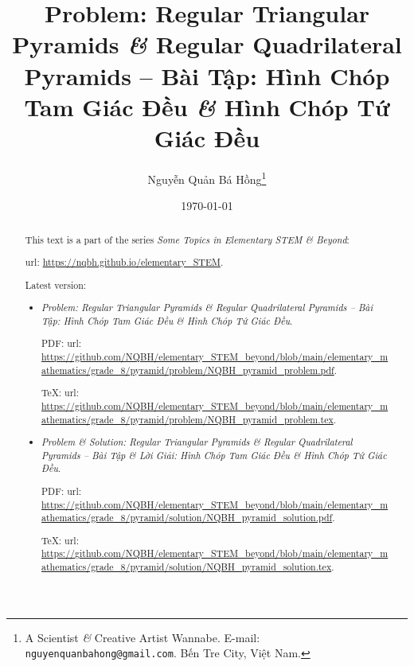 \documentclass{article}
\title{Problem: Regular Triangular Pyramids {\it\&} Regular Quadrilateral Pyramids -- Bài Tập: Hình Chóp Tam Giác Đều {\it\&} Hình Chóp Tứ Giác Đều}
\author{Nguyễn Quản Bá Hồng\footnote{A Scientist {\it\&} Creative Artist Wannabe. E-mail: {\tt nguyenquanbahong@gmail.com}. Bến Tre City, Việt Nam.}}
\date{\today}
\begin{document}
\maketitle
\begin{abstract}
	This text is a part of the series {\it Some Topics in Elementary STEM \& Beyond}:
	
	{\sc url}: \url{https://nqbh.github.io/elementary_STEM}.
	
	Latest version:
	\begin{itemize}
		\item {\it Problem: Regular Triangular Pyramids {\it\&} Regular Quadrilateral Pyramids -- Bài Tập: Hình Chóp Tam Giác Đều {\it\&} Hình Chóp Tứ Giác Đều}.
		
		PDF: {\sc url}: \url{https://github.com/NQBH/elementary_STEM_beyond/blob/main/elementary_mathematics/grade_8/pyramid/problem/NQBH_pyramid_problem.pdf}.
		
		\TeX: {\sc url}: \url{https://github.com/NQBH/elementary_STEM_beyond/blob/main/elementary_mathematics/grade_8/pyramid/problem/NQBH_pyramid_problem.tex}.
		\item {\it Problem \& Solution: Regular Triangular Pyramids \& Regular Quadrilateral Pyramids -- Bài Tập \& Lời Giải: Hình Chóp Tam Giác Đều \& Hình Chóp Tứ Giác Đều}.
		
		PDF: {\sc url}: \url{https://github.com/NQBH/elementary_STEM_beyond/blob/main/elementary_mathematics/grade_8/pyramid/solution/NQBH_pyramid_solution.pdf}.
		
		\TeX: {\sc url}: \url{https://github.com/NQBH/elementary_STEM_beyond/blob/main/elementary_mathematics/grade_8/pyramid/solution/NQBH_pyramid_solution.tex}.
	\end{itemize}
\end{abstract}
\tableofcontents

\end{document}
